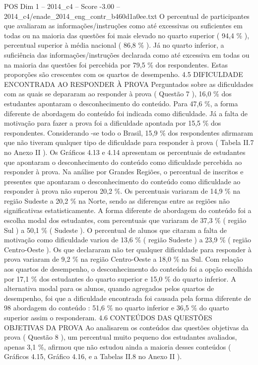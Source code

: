 \begin{textsample}{POS Dim 1 – 2014\_c4 – Score -3.00 – 2014\_c4/enade\_2014\_eng\_contr\_b460d1a0ee.txt}
O percentual de participantes que avaliaram as informações/instruções como até excessivas ou suficientes em todas ou na maioria das questões foi mais elevado no quarto superior ( 94,4 \% ), percentual superior à média nacional ( 86,8 \% ).
Já no quarto inferior, a suficiência das informações/instruções declarada como até excessiva em todas ou na maioria das questões foi percebida por 79,5 \% dos respondentes.
Estas proporções são crescentes com os quartos de desempenho. 4.5 DIFICULDADE ENCONTRADA AO RESPONDER À PROVA Perguntados sobre as dificuldades com as quais se depararam ao responder à prova ( Questão 7 ), 16,0 \% dos estudantes apontaram o desconhecimento do conteúdo.
Para 47,6 \%, a forma diferente de abordagem do conteúdo foi indicada como dificuldade.
Já a falta de motivação para fazer a prova foi a dificuldade apontada por 15,5 \% dos respondentes.
Considerando -se todo o Brasil, 15,9 \% dos respondentes afirmaram que não tiveram qualquer tipo de dificuldade para responder à prova ( Tabela II.7 no Anexo II ).
Os Gráficos 4.13 e 4.14 apresentam os percentuais de estudantes que apontaram o desconhecimento do conteúdo como dificuldade percebida ao responder à prova.
Na análise por Grandes Regiões, o percentual de inscritos e presentes que apontaram o desconhecimento do conteúdo como dificuldade ao responder à prova não superou 20,2 \%.
Os percentuais variaram de 14,9 \% na região Sudeste a 20,2 \% na Norte, sendo as diferenças entre as regiões não significativas estatisticamente.
A forma diferente de abordagem do conteúdo foi a escolha modal dos estudantes, com percentuais que variaram de 37,3 \% ( região Sul ) a 50,1 \% ( Sudeste ).
O percentual de alunos que citaram a falta de motivação como dificuldade variou de 13,6 \% ( região Sudeste ) a 23,9 \% ( região Centro-Oeste ).
Os que declararam não ter qualquer dificuldade para responder à prova variaram de 9,2 \% na região Centro-Oeste a 18,0 \% na Sul.
Com relação aos quartos de desempenho, o desconhecimento do conteúdo foi a opção escolhida por 17,1 \% dos estudantes do quarto superior e 15,0 \% do quarto inferior.
A alternativa modal para os alunos, quando agregados pelos quartos de desempenho, foi que a dificuldade encontrada foi causada pela forma diferente de 98 abordagem do conteúdo : 51,6 \% no quarto inferior e 36,5 \% do quarto superior assim o responderam. 4.6 CONTEÚDOS DAS QUESTÕES OBJETIVAS DA PROVA Ao analisarem os conteúdos das questões objetivas da prova ( Questão 8 ), um percentual muito pequeno dos estudantes avaliados, apenas 3,1 \%, afirmou que não estudou ainda a maioria desses conteúdos ( Gráficos 4.15, Gráfico 4.16, e a Tabelas II.8 no Anexo II ).

\end{textsample}
